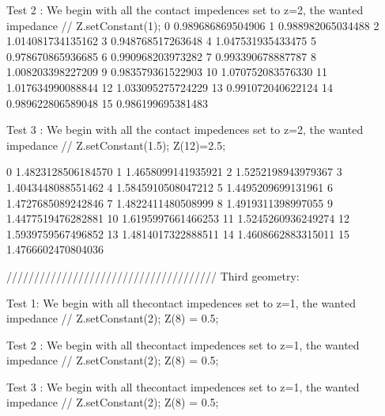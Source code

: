  Test 2 :
 We begin with all the contact impedences set to z=2, the wanted impedance  //  Z.setConstant(1);
 0     0.989686869504906
 1     0.988982065034488
 2     1.014081734135162
 3     0.948768517263648
 4     1.047531935433475
 5     0.978670865936685
 6     0.990968203973282
 7     0.993390678887787
 8     1.008203398227209
 9     0.983579361522903
 10    1.070752083576330
 11    1.017634990088844
 12    1.033095275724229
 13    0.991072040622124
 14    0.989622806589048
 15    0.986199695381483

 Test 3 :
 We begin with all the contact impedences set to z=2, the wanted impedance  // Z.setConstant(1.5);
 Z(12)=2.5;

0     1.4823128506184570
1     1.4658099141935921
2     1.5252198943979367
3     1.4043448088551462
4     1.5845910508047212
5     1.4495209699131961
6     1.4727685089242846
7     1.4822411480508999
8     1.4919311398997055
9     1.4477519476282881
10    1.6195997661466253
11    1.5245260936249274
12    1.5939759567496852
13    1.4814017322888511
14    1.4608662883315011
15    1.4766602470804036

//////////////////////////////////////
 Third geometry:
  
 Test 1:
 We begin with all thecontact impedences set to z=1, the wanted impedance  // Z.setConstant(2); Z(8) = 0.5;


 Test 2 :
 We begin with all thecontact impedences set to z=1, the wanted impedance  // Z.setConstant(2); Z(8) = 0.5;


 Test 3 :
 We begin with all thecontact impedences set to z=1, the wanted impedance  // Z.setConstant(2); Z(8) = 0.5;










